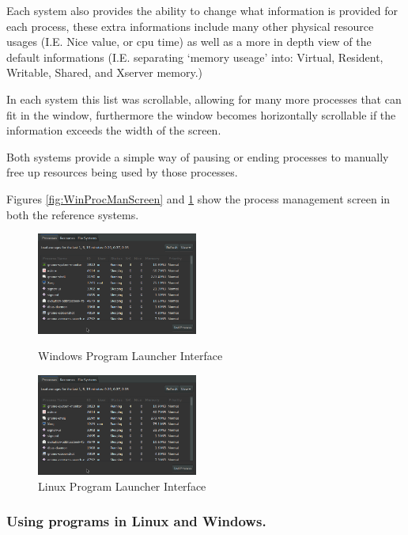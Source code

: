 \documentclass[a4paper]{report}
\begin{document}
Each system also provides the ability to change what information is provided for each process, these extra informations include many other physical resource usages (I.E. Nice value, or cpu time) as well as a more in depth view of the default informations (I.E. separating `memory useage' into: Virtual, Resident, Writable, Shared, and Xserver memory.)

In each system this list was scrollable, allowing for many more processes that can fit in the window, furthermore the window becomes horizontally scrollable if the information exceeds the width of the screen.

Both systems provide a simple way of pausing or ending processes to manually free up resources being used by those processes.

Figures \ref{fig:WinProcManScreen} and \ref{fig:LinProcManScreen} show the process management screen in both the reference systems.

\begin{figure}[ht]
\centering
\begin{minipage}{.5\textwidth}
  \centering
  \includegraphics[width=200px]{images/Linux_Program_Manager_Screenshot}
  \caption{Windows Program Launcher Interface}
  \label{fig:WinProcManScreen}
\end{minipage}%
\begin{minipage}{.5\textwidth}
  \centering
  \includegraphics[width=200px]{images/Linux_Program_Manager_Screenshot}
  \caption{Linux Program Launcher Interface}
  \label{fig:LinProcManScreen}
\end{minipage} 
\end{figure}


\subsubsection*{Using programs in Linux and Windows.}
\end{document}
